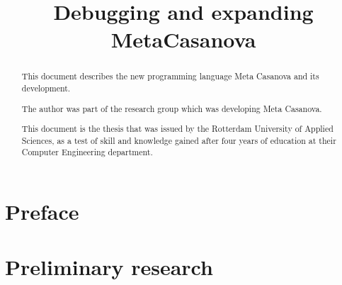 


\title{Debugging and expanding MetaCasanova}
\author{\writer}

\begin{titlepage}
   
\end{titlepage}


\cleardoublepage
\begin{abstract}
   This document describes the new programming language Meta Casanova and its development.

   The author was part of the research group which was developing Meta Casanova.

   This document is the thesis that was issued by the Rotterdam University of Applied Sciences, as a test of skill and knowledge gained after four years of education at their Computer Engineering department.
\end{abstract}
\cleardoublepage


\setcounter{tocdepth}{1}
\pagestyle{contents}
\tableofcontents
\cleardoublepage

\pagestyle{mine}

\part{Preface}
\cleardoublepage

\cleardoublepage

\part{Preliminary research}
\cleardoublepage


\cleardoublepage


\cleardoublepage

